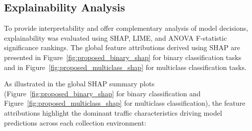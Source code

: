 \documentclass[a4paper,fleqn]{cas-sc}
\begin{document}
\subsection{Explainability Analysis}

To provide interpretability and offer complementary analysis of model decisions, explainability was evaluated using SHAP, LIME, and ANOVA F-statistic significance rankings. The global feature attributions derived using SHAP are presented in Figure~\ref{fig:proposed_binary_shap} for binary classification tasks and in Figure~\ref{fig:proposed_multiclass_shap} for multiclass classification tasks.

As illustrated in the global SHAP summary plots (Figure~\ref{fig:proposed_binary_shap} for binary classification and Figure~\ref{fig:proposed_multiclass_shap} for multiclass classification), the feature attributions highlight the dominant traffic characteristics driving model predictions across each collection environment:
\end{document}
